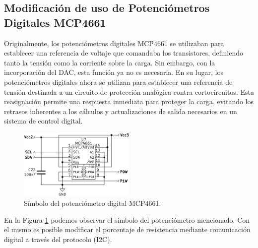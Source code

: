 \subsection{Modificación de uso de Potenciómetros Digitales MCP4661}
Originalmente, los potenciómetros digitales MCP4661 se utilizaban para establecer una referencia de voltaje que comandaba los transistores, definiendo tanto la tensión como la corriente sobre la carga. Sin embargo, con la incorporación del DAC, esta función ya no es necesaria. En su lugar, los potenciómetros digitales ahora se utilizan para establecer una referencia de tensión destinada a un circuito de protección analógica contra cortocircuitos. Esta reasignación permite una respuesta inmediata para proteger la carga, evitando los retrasos inherentes a los cálculos y actualizaciones de salida necesarios en un sistema de control digital.
\begin{figure}[H]
    \centering
    \includegraphics[width=0.5\textwidth]{./imagenes/potenciometro_digital.png}
    \caption{Símbolo del potenciómetro digital MCP4661.}
    \label{F:potenciometro_digital}
\end{figure}
En la Figura \ref{F:potenciometro_digital} podemos observar el símbolo del potenciómetro mencionado. Con el mismo es posible modificar el porcentaje de resistencia mediante comunicación digital a través del protocolo  (I2C).


